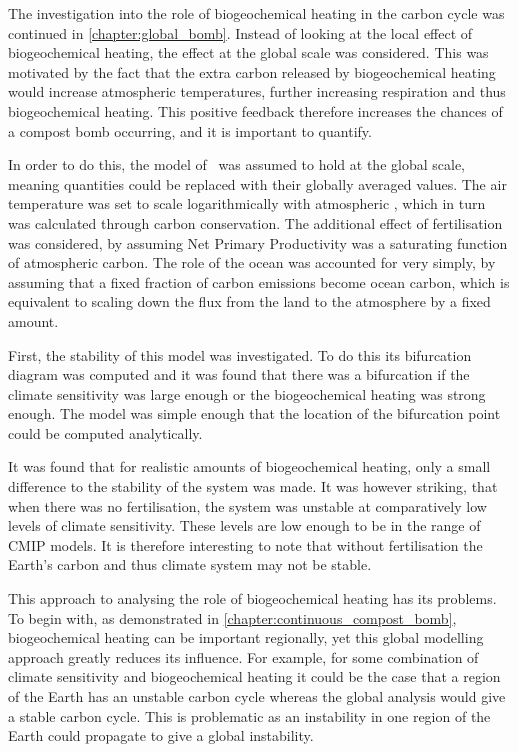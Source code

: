 The investigation into the role of biogeochemical heating in the carbon cycle was continued in \cref{chapter:global_bomb}. Instead of looking at the local effect of biogeochemical heating,
the effect at the global scale was considered. This was motivated by the fact that the extra carbon released by biogeochemical heating would increase atmospheric temperatures,
further increasing respiration and thus biogeochemical heating.
This positive feedback therefore increases the chances of a compost bomb occurring, and it is important to quantify.

In order to do this, the model of~\cite{Luke2011} was assumed to hold at the global scale, meaning quantities could be replaced with their globally averaged values. The air temperature
was set to scale logarithmically with atmospheric , which in turn was calculated through carbon conservation. The additional effect of  fertilisation was considered,
by assuming Net Primary Productivity was a saturating function of atmospheric carbon. The role of the ocean was accounted for very simply, by assuming that a fixed fraction of
carbon emissions become ocean carbon, which is equivalent to scaling down the flux from the land to the atmosphere by a fixed amount.

First, the stability of this model was investigated. To do this its bifurcation diagram was computed and it was found that there was a bifurcation if the climate sensitivity was large enough
or the biogeochemical heating was strong enough. The model was simple enough that the location of the bifurcation point could be computed analytically. 

It was found that for realistic amounts of biogeochemical heating, only a small difference to the stability of the system was made. It was however striking, that when there was no
 fertilisation, the system was unstable at comparatively low levels of climate sensitivity. These levels are low enough to be in the range of CMIP models. It is therefore interesting to note
that without  fertilisation the Earth's carbon and thus climate system may not be stable.

This approach to analysing the role of biogeochemical heating has its problems. To begin with, as demonstrated in \cref{chapter:continuous_compost_bomb}, biogeochemical heating
can be important regionally, yet this global modelling approach greatly reduces its influence. For example, for some combination of climate sensitivity and biogeochemical heating
it could be the case that a region of the Earth has an unstable carbon cycle whereas the global analysis would give a stable carbon cycle. This is problematic as an instability in one
region of the Earth could propagate to give a global instability.

